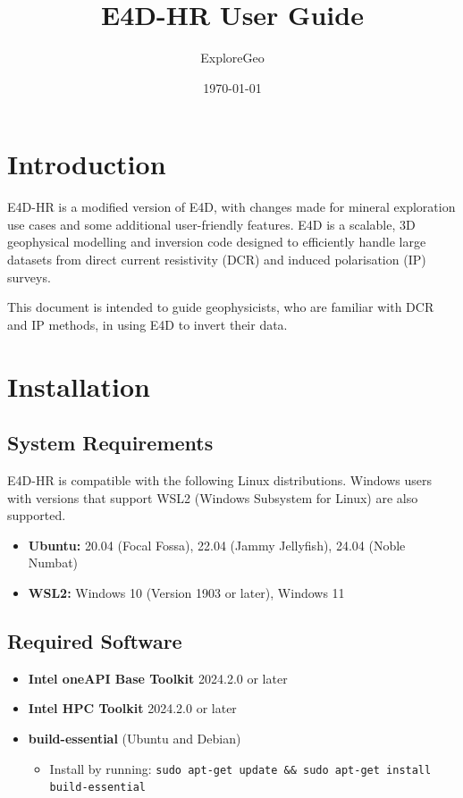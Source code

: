 \documentclass[a4paper,12pt]{article}
\title{E4D-HR User Guide}
\author{ExploreGeo}
\date{\today}
\begin{document}
\maketitle

\newpage

\tableofcontents

\newpage

\section{Introduction}

E4D-HR is a modified version of E4D, with changes made for mineral exploration use cases and some additional user-friendly features. E4D is a scalable, 3D geophysical modelling and inversion code designed to efficiently handle large datasets from direct current resistivity (DCR) and induced polarisation (IP) surveys.

This document is intended to guide geophysicists, who are familiar with DCR and IP methods, in using E4D to invert their data.


\section{Installation}

\subsection{System Requirements}

E4D-HR is compatible with the following Linux distributions. Windows users with versions that support WSL2 (Windows Subsystem for Linux) are also supported.

\begin{itemize}
    \item \textbf{Ubuntu:} 20.04 (Focal Fossa), 22.04 (Jammy Jellyfish), 24.04 (Noble Numbat)
    \item \textbf{WSL2:} Windows 10 (Version 1903 or later), Windows 11
\end{itemize}

\subsection{Required Software}

\begin{itemize}
    \item \textbf{Intel oneAPI Base Toolkit} 2024.2.0 or later
    \item \textbf{Intel HPC Toolkit} 2024.2.0 or later
    \item \textbf{build-essential} (Ubuntu and Debian)
    \begin{itemize}
        \item Install by running: \texttt{sudo apt-get update \&\& sudo apt-get install build-essential}
    \end{itemize}
\end{itemize}
\end{document}
